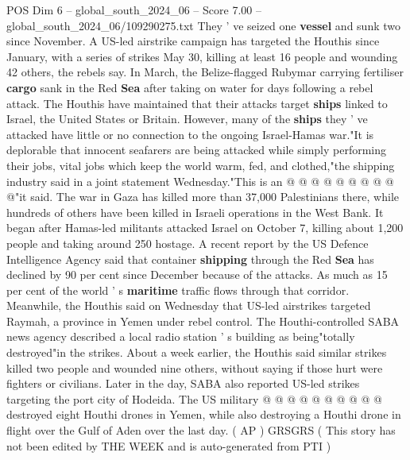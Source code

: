 \begin{textsample}{POS Dim 6 – global\_south\_2024\_06 – Score 7.00 – global\_south\_2024\_06/109290275.txt}
They ' ve seized one \textbf{vessel} and sunk two since November.
A US-led airstrike campaign has targeted the Houthis since January, with a series of strikes May 30, killing at least 16 people and wounding 42 others, the rebels say.
In March, the Belize-flagged Rubymar carrying fertiliser \textbf{cargo} sank in the Red \textbf{Sea} after taking on water for days following a rebel attack.
The Houthis have maintained that their attacks target \textbf{ships} linked to Israel, the United States or Britain.
However, many of the \textbf{ships} they ' ve attacked have little or no connection to the ongoing Israel-Hamas war."It is deplorable that innocent seafarers are being attacked while simply performing their jobs, vital jobs which keep the world warm, fed, and clothed,"the shipping industry said in a joint statement Wednesday."This is an @ @ @ @ @ @ @ @ @ @"it said.
The war in Gaza has killed more than 37,000 Palestinians there, while hundreds of others have been killed in Israeli operations in the West Bank.
It began after Hamas-led militants attacked Israel on October 7, killing about 1,200 people and taking around 250 hostage.
A recent report by the US Defence Intelligence Agency said that container \textbf{shipping} through the Red \textbf{Sea} has declined by 90 per cent since December because of the attacks.
As much as 15 per cent of the world ' s \textbf{maritime} traffic flows through that corridor.
Meanwhile, the Houthis said on Wednesday that US-led airstrikes targeted Raymah, a province in Yemen under rebel control.
The Houthi-controlled SABA news agency described a local radio station ' s building as being"totally destroyed"in the strikes.
About a week earlier, the Houthis said similar strikes killed two people and wounded nine others, without saying if those hurt were fighters or civilians.
Later in the day, SABA also reported US-led strikes targeting the port city of Hodeida.
The US military @ @ @ @ @ @ @ @ @ @ destroyed eight Houthi drones in Yemen, while also destroying a Houthi drone in flight over the Gulf of Aden over the last day. ( AP ) GRSGRS ( This story has not been edited by THE WEEK and is auto-generated from PTI )

\end{textsample}
